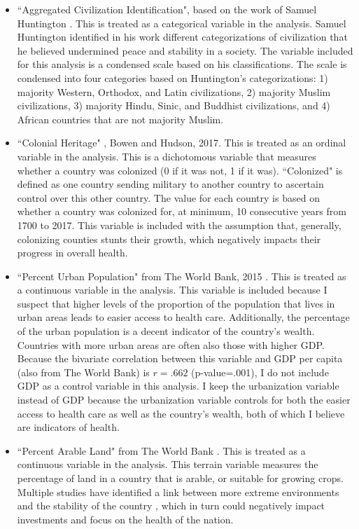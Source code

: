 \begin{itemize}
\item ``Aggregated Civilization Identification", based on the work of Samuel Huntington \citep{Huntington}. This is treated as a categorical variable in the analysis.  Samuel Huntington identified in his work different categorizations of civilization that he believed undermined peace and stability in a society. The variable included for this analysis is a condensed scale based on his classifications. The scale is condensed into four categories based on Huntington's categorizations: 1) majority Western, Orthodox, and Latin civilizations, 2) majority Muslim civilizations, 3) majority Hindu, Sinic, and Buddhist civilizations, and 4) African countries that are not majority Muslim. 
\item ``Colonial Heritage" , Bowen and Hudson, 2017.  This is treated as an ordinal variable in the analysis. This is a dichotomous variable that measures whether a country was colonized (0 if it was not, 1 if it was). ``Colonized" is defined as one country sending military to another country to ascertain control over this other country. The value for each country is based on whether a country was colonized for, at minimum, 10 consecutive years from 1700 to 2017. This variable is included with the assumption that, generally, colonizing counties stunts their growth, which negatively impacts their progress in overall health.
\item ``Percent Urban Population" from The World Bank, 2015 \citep{WB2015}. This is treated as a continuous variable in the analysis. This variable is included because I suspect that higher levels of the proportion of the population that lives in urban areas leads to easier access to health care. Additionally, the percentage of the urban population is a decent indicator of the country's wealth. Countries with more urban areas are often also those with higher GDP. Because the bivariate correlation between this variable and GDP per capita (also from The World Bank) is $r=.662$ (p-value=.001), I do not include GDP as a control variable in this analysis. I keep the urbanization variable instead of GDP because the urbanization variable controls for both the easier access to health care as well as the country's wealth, both of which I believe are indicators of health. 
\item ``Percent Arable Land" from The World Bank \citep{WB2014}. This is treated as a continuous variable in the analysis. This terrain variable measures the percentage of land in a country that is arable, or suitable for growing crops. Multiple studies have identified a link between more extreme environments and the stability of the country \citep{Homer, Pickering, Emerson, Fukuyama}, which in turn could negatively impact investments and focus on the health of the nation.

\end{itemize}
